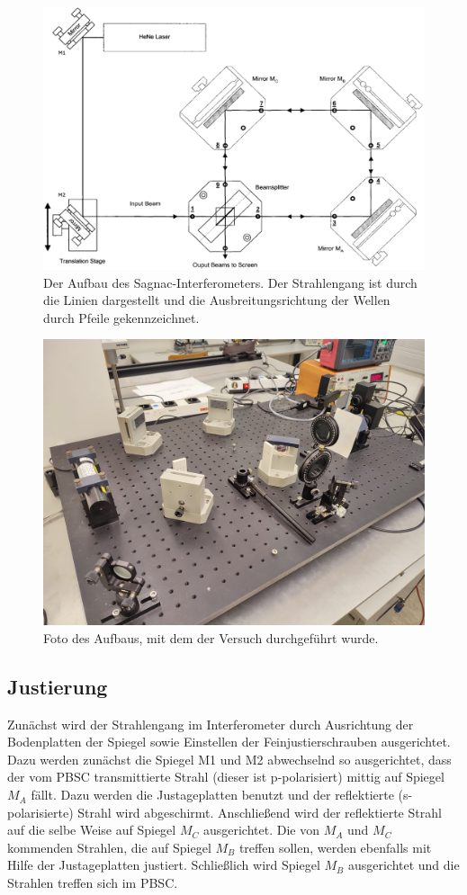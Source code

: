 \begin{figure}
    \centering
    \includegraphics[width=0.7\linewidth]{./figures/aufbau.png}
    \caption{Der Aufbau des Sagnac-Interferometers. Der Strahlengang ist durch die Linien dargestellt und die Ausbreitungsrichtung der Wellen durch Pfeile gekennzeichnet. \cite{anleitung}}
    \label{fig:aufbau}
\end{figure}

\begin{figure}
    \centering
    \includegraphics[width=0.7\linewidth]{./figures/aufbau_foto.jpeg}
    \caption{Foto des Aufbaus, mit dem der Versuch durchgeführt wurde.}
    \label{fig:fotos}
\end{figure}

\subsection{Justierung}
Zunächst wird der Strahlengang im Interferometer durch Ausrichtung der Bodenplatten der Spiegel sowie Einstellen der Feinjustierschrauben ausgerichtet. Dazu werden zunächst die Spiegel M1 und M2 abwechselnd so ausgerichtet, dass der vom PBSC transmittierte Strahl (dieser ist p-polarisiert) mittig auf Spiegel $M_A$ fällt. Dazu werden die Justageplatten benutzt und der reflektierte (s-polarisierte) Strahl wird abgeschirmt. Anschließend wird der reflektierte Strahl auf die selbe Weise auf Spiegel $M_C$ ausgerichtet. Die von $M_A$ und $M_C$ kommenden Strahlen, die auf Spiegel $M_B$ treffen sollen, werden ebenfalls mit Hilfe der Justageplatten justiert. Schließlich wird Spiegel $M_B$ ausgerichtet und die Strahlen treffen sich im PBSC.

